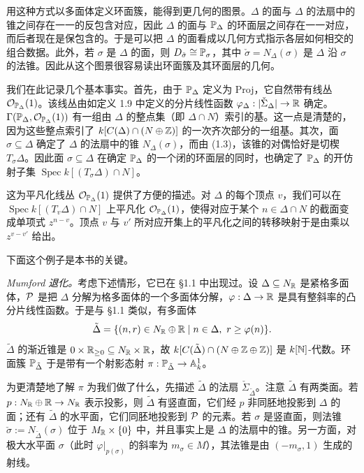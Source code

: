 用这种方式以多面体定义环面簇，能得到更几何的图景。$\Delta$ 的面与 $\Delta$ 的法扇中的锥之间存在一一的反包含对应，因此 $\Delta$ 的面与 $\mathbb{P}_\Delta$ 的环面层之间存在一一对应，而后者现在是保包含的。于是可以把 $\Delta$ 的面看成以几何方式指示各层如何相交的组合数据。此外，若 $\sigma$ 是 $\Delta$ 的面，则 $D_{\check\sigma}\cong\mathbb{P}_\sigma$，其中 $\check\sigma=N_\Delta(\sigma)$ 是 $\Delta$ 沿 $\sigma$ 的法锥。因此从这个图景很容易读出环面簇及其环面层的几何。

\begin{remark}
我们在此记录几个基本事实。首先，由于 $\mathbb{P}_\Delta$ 定义为 Proj，它自然带有线丛 $\mathcal{O}_{\mathbb{P}_\Delta}(1)$。该线丛由如定义 1.9 中定义的分片线性函数 $\varphi_\Delta:|\check\Sigma_\Delta|\to\mathbb{R}$ 确定。$\Gamma(\mathbb{P}_\Delta,\mathcal{O}_{\mathbb{P}_\Delta}(1))$ 有一组由 $\Delta$ 的整点集（即 $\Delta\cap N$）索引的基。这一点是清楚的，因为这些整点索引了 $k[C(\Delta)\cap(N\oplus\mathbb{Z})]$ 的一次齐次部分的一组基。其次，面 $\sigma\subseteq\Delta$ 确定了 $\Delta$ 的法扇中的锥 $N_\Delta(\sigma)$，而由 (1.3)，该锥的对偶恰好是切楔 $T_\sigma\Delta$。因此面 $\sigma\subseteq\Delta$ 在确定 $\mathbb{P}_\Delta$ 的一个闭的环面层的同时，也确定了 $\mathbb{P}_\Delta$ 的开仿射子集 $\operatorname{Spec} k[(T_\sigma\Delta)\cap N]$。

这为平凡化线丛 $\mathcal{O}_{\mathbb{P}_\Delta}(1)$ 提供了方便的描述。对 $\Delta$ 的每个顶点 $v$，我们可以在 $\operatorname{Spec} k[(T_v\Delta)\cap N]$ 上平凡化 $\mathcal{O}_{\mathbb{P}_\Delta}(1)$，使得对应于某个 $n\in\Delta\cap N$ 的截面变成单项式 $z^{n-v}$。顶点 $v$ 与 $v'$ 所对应开集上的平凡化之间的转移映射于是由乘以 $z^{v-v'}$ 给出。
\end{remark}

下面这个例子是本书的关键。

\begin{example}
\textit{Mumford 退化。}考虑下述情形，它已在 §1.1 中出现过。设 $\Delta\subseteq N_{\mathbb{R}}$ 是紧格多面体，$\mathcal{P}$ 是把 $\Delta$ 分解为格多面体的一个多面体分解，$\varphi:\Delta\to\mathbb{R}$ 是具有整斜率的凸分片线性函数。于是与 §1.1 类似，有多面体
\[
  \tilde\Delta=\{(n,r)\in N_{\mathbb{R}}\oplus\mathbb{R}\mid n\in\Delta,\ r\ge\varphi(n)\}.
\]
$\tilde\Delta$ 的渐近锥是 $0\times\mathbb{R}_{\ge 0}\subseteq N_{\mathbb{R}}\times\mathbb{R}$，故 $k[C(\tilde\Delta)\cap(N\oplus\mathbb{Z}\oplus\mathbb{Z})]$ 是 $k[\mathbb{N}]$-代数。环面簇 $\mathbb{P}_{\tilde\Delta}$ 于是带有一个射影态射 $\pi:\mathbb{P}_{\tilde\Delta}\to\mathbb{A}^1_k$。

为更清楚地了解 $\pi$ 为我们做了什么，先描述 $\tilde\Delta$ 的法扇 $\check\Sigma_{\tilde\Delta}$。注意 $\tilde\Delta$ 有两类面。若 $p:N_{\mathbb{R}}\oplus\mathbb{R}\to N_{\mathbb{R}}$ 表示投影，则 $\tilde\Delta$ 有竖直面，它们经 $p$ 非同胚地投影到 $\Delta$ 的面；还有 $\tilde\Delta$ 的水平面，它们同胚地投影到 $\mathcal{P}$ 的元素。若 $\sigma$ 是竖直面，则法锥 $\check\sigma:=N_{\tilde\Delta}(\sigma)$ 位于 $M_{\mathbb{R}}\times\{0\}$ 中，并且事实上是 $\Delta$ 的法扇中的锥。另一方面，对极大水平面 $\sigma$（此时 $\varphi|_{p(\sigma)}$ 的斜率为 $m_\sigma\in M$），其法锥是由 $(-m_\sigma,1)$ 生成的射线。
\end{example}

